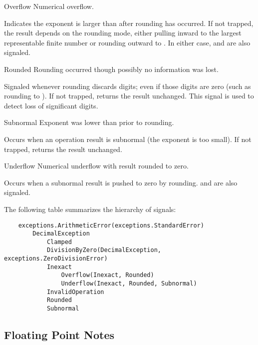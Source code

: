 \begin{classdesc*}{Overflow}
    Numerical overflow.

    Indicates the exponent is larger than  after rounding has
    occurred.  If not trapped, the result depends on the rounding mode, either
    pulling inward to the largest representable finite number or rounding
    outward to .  In either case,  and
     are also signaled.   
\end{classdesc*}

\begin{classdesc*}{Rounded}
    Rounding occurred though possibly no information was lost.

    Signaled whenever rounding discards digits; even if those digits are
    zero (such as rounding  to ).   If not
    trapped, returns the result unchanged.  This signal is used to detect
    loss of significant digits.
\end{classdesc*}

\begin{classdesc*}{Subnormal}
    Exponent was lower than  prior to rounding.
          
    Occurs when an operation result is subnormal (the exponent is too small).
    If not trapped, returns the result unchanged.
\end{classdesc*}

\begin{classdesc*}{Underflow}
    Numerical underflow with result rounded to zero.

    Occurs when a subnormal result is pushed to zero by rounding.
     and  are also signaled.
\end{classdesc*}

The following table summarizes the hierarchy of signals:

\begin{verbatim}    
    exceptions.ArithmeticError(exceptions.StandardError)
        DecimalException
            Clamped
            DivisionByZero(DecimalException, exceptions.ZeroDivisionError)
            Inexact
                Overflow(Inexact, Rounded)
                Underflow(Inexact, Rounded, Subnormal)
            InvalidOperation
            Rounded
            Subnormal
\end{verbatim}            


\subsection{Floating Point Notes \label{decimal-notes}}

